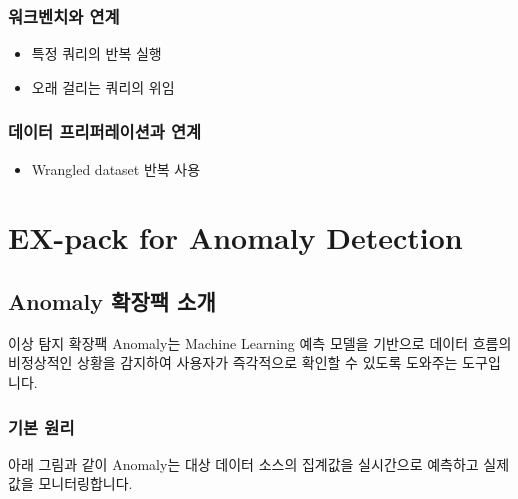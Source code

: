 \documentclass[letterpaper,10pt,english]{sphinxmanual}
\begin{document}
\section{워크벤치와 연계}
\label{\detokenize{integrator/part05/index:id2}}\begin{itemize}
\item {} 
특정 쿼리의 반복 실행

\item {} 
오래 걸리는 쿼리의 위임

\end{itemize}


\section{데이터 프리퍼레이션과 연계}
\label{\detokenize{integrator/part05/index:id3}}\begin{itemize}
\item {} 
Wrangled dataset 반복 사용

\end{itemize}


\part{EX-pack for Anomaly Detection}
\label{\detokenize{index:ex-pack-for-anomaly-detection}}

\chapter{Anomaly 확장팩 소개}
\label{\detokenize{anomaly/part01/index:anomaly}}\label{\detokenize{anomaly/part01/index::doc}}
이상 탐지 확장팩 Anomaly는 Machine Learning 예측 모델을 기반으로 데이터 흐름의 비정상적인 상황을 감지하여 사용자가 즉각적으로 확인할 수 있도록 도와주는 도구입니다.


\section{기본 원리}
\label{\detokenize{anomaly/part01/index:basic-principles}}\label{\detokenize{anomaly/part01/index:id1}}
아래 그림과 같이 Anomaly는 대상 데이터 소스의 집계값을 실시간으로 예측하고 실제 값을 모니터링합니다.
\begin{quote}

\begin{figure}[H]
\centering

\noindent{}
\end{figure}
\end{quote}
\end{document}
